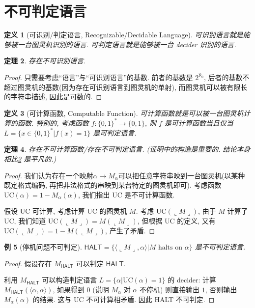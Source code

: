 \documentclass[8pt]{article}
\theoremstyle{compact}
\newtheorem{theorem}{定理}[section]
\newtheorem{definition}[theorem]{定义}
\newtheorem{example}[theorem]{例}
\def\rep#1{\llcorner{#1}\lrcorner}
\begin{document}
\section{不可判定语言}
\begin{definition}[可识别/判定语言, Recognizable/Decidable Language]
	可识别语言就是能够被一台图灵机识别的语言. 可判定语言就是能够被一台 decider 识别的语言.
\end{definition}
\begin{theorem}
	存在不可识别语言.
	\label{unrecognize_exists}
\end{theorem}
\begin{proof}
	只需要考虑“语言”与“可识别语言”的基数. 前者的基数是 $2^{\aleph_0}$, 后者的基数不超过图灵机的基数(因为存在可识别语言到图灵机的单射), 而图灵机可以被有限长的字符串描述, 因此是可数的.
\end{proof}
\begin{definition}[可计算函数, Computable Function]
	可计算函数就是可以被一台图灵机计算的函数. 特别的, 考虑函数 $f: \{0, 1\}^* \to \{0, 1\}$, 则 $f$ 是可计算函数当且仅当 $L = \{x \in \{0, 1\}^*| f(x) = 1\}$ 是可判定语言.
\end{definition}
\begin{theorem}
	存在不可计算函数/存在不可判定语言. (证明中的构造是重要的. 结论本身相比\cref{unrecognize_exists} 是平凡的.)
\end{theorem}
\begin{proof}
	我们认为存在一个映射$\alpha \to M_{\alpha}$可以把任意字符串映到一台图灵机(以某种既定格式编码, 再把非法格式的串映到某台特定的图灵机即可). 考虑函数 $\text{UC}(\alpha) = 1 - M_{\alpha}(\alpha)$, 我们指出 $\text{UC}$ 是不可计算函数.

	假设 $\text{UC}$ 可计算, 考虑计算 $\text{UC}$ 的图灵机 $M$. 考虑 $\text{UC}(\rep{M})$, 由于 $M$ 计算了 $\text{UC}$, 我们知道 $\text{UC}(\rep{M}) = M(\rep M)$, 但根据 $\text{UC}$ 的定义, 又有 $\text{UC}(\rep M) = 1 - M(\rep M)$, 产生了矛盾.
\end{proof}
\begin{example}[停机问题不可判定]
	$\textsf{HALT} = \{\langle \rep M, \alpha \rangle | M \text{ halts on } \alpha\}$ 是不可判定语言.
\end{example}
\begin{proof}
	假设存在 $M_{\textsf{HALT}}$ 可以判定 $\textsf{HALT}$.
	
	利用 $M_{\textsf{HALT}}$ 可以构造判定语言 $L = \{\alpha | \text{UC}(\alpha) = 1\}$ 的 decider: 计算 $M_{\textsf{HALT}}(\langle \alpha, \alpha \rangle)$, 如果得到 $0$ (说明 $M_{\alpha}$ 对 $\alpha$ 不停机) 则直接输出 $1$, 否则输出$M_{\alpha}(\alpha)$ 的结果. 这与 $\text{UC}$ 不可计算相矛盾. 因此 \textsf{HALT} 不可判定.
\end{proof}
\end{document}
